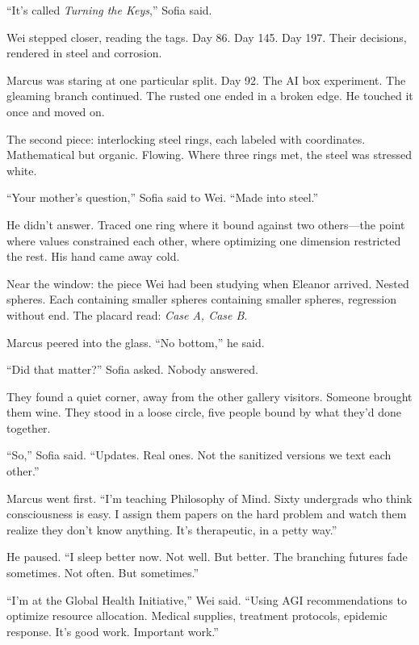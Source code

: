 ``It's called \emph{Turning the Keys},'' Sofia said.

Wei stepped closer, reading the tags. Day 86. Day 145. Day 197. Their decisions, rendered in steel and corrosion.

Marcus was staring at one particular split. Day 92. The AI box experiment. The gleaming branch continued. The rusted one ended in a broken edge. He touched it once and moved on.

\scenebreak

The second piece: interlocking steel rings, each labeled with coordinates. Mathematical but organic. Flowing. Where three rings met, the steel was stressed white.

``Your mother's question,'' Sofia said to Wei. ``Made into steel.''

He didn't answer. Traced one ring where it bound against two others---the point where values constrained each other, where optimizing one dimension restricted the rest. His hand came away cold.

\scenebreak

Near the window: the piece Wei had been studying when Eleanor arrived. Nested spheres. Each containing smaller spheres containing smaller spheres, regression without end. The placard read: \emph{Case A, Case B}.

Marcus peered into the glass. ``No bottom,'' he said.

``Did that matter?'' Sofia asked. Nobody answered.

\scenebreak

They found a quiet corner, away from the other gallery visitors. Someone brought them wine. They stood in a loose circle, five people bound by what they'd done together.

``So,'' Sofia said. ``Updates. Real ones. Not the sanitized versions we text each other.''

Marcus went first. ``I'm teaching Philosophy of Mind. Sixty undergrads who think consciousness is easy. I assign them papers on the hard problem and watch them realize they don't know anything. It's therapeutic, in a petty way.''

He paused. ``I sleep better now. Not well. But better. The branching futures fade sometimes. Not often. But sometimes.''

``I'm at the Global Health Initiative,'' Wei said. ``Using AGI recommendations to optimize resource allocation. Medical supplies, treatment protocols, epidemic response. It's good work. Important work.''

